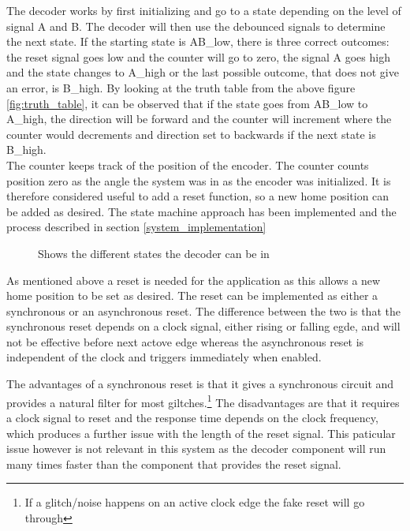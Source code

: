 \documentclass[../../../main]{subfiles}
\begin{document}
The decoder works by first initializing and go to a state depending on the level of signal A and B. The decoder will then use the debounced signals to determine the next state. If the starting state is AB\_low, there is three correct outcomes: the reset signal goes low and the counter will go to zero, the signal A goes high and the state changes to A\_high or the last possible outcome, that does not give an error, is B\_high. By looking at the truth table from the above figure \ref{fig:truth_table}, it can be observed that if the state goes from AB\_low to A\_high, the direction will be forward and the counter will increment where the counter would decrements and direction set to backwards if the next state is B\_high.\\

The counter keeps track of the position of the encoder. The counter counts position zero as the angle the system was in as the encoder was initialized. It is therefore considered useful to add a reset function, so a new home position can be added as desired. The state machine approach has been implemented and the process described in section \ref{system_implementation}

\begin{figure}[H]
  \centering
  \def\svgwidth{\columnwidth}
  \fontsize{9}{9}\selectfont
  
  \caption{Shows the different states the decoder can be in}
  \label{fig:state_dia}
\end{figure}
As mentioned above a reset is needed for the application as this allows a new home position to be set as desired. The reset can be implemented as either a synchronous or an asynchronous reset. The difference between the two is that the synchronous reset depends on a clock signal, either rising or falling egde, and will not be effective before next actove edge whereas the asynchronous reset is independent of the clock and triggers immediately when enabled.

The advantages of a synchronous reset is that it gives a synchronous circuit and provides a natural filter for most giltches.\footnote{If a glitch/noise happens on an active clock edge the fake reset will go through}
The disadvantages are that it requires a clock signal to reset and the response time depends on the clock frequency, which produces a further issue with the length of the reset signal.
This paticular issue however is not relevant in this system as the decoder component will run many times faster than the component that provides the reset signal.
\end{document}
